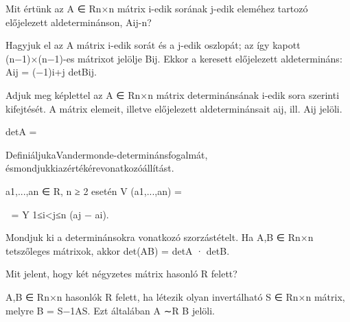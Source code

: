 \begin{frame}
  \begin{tcolorbox}[title={25}]
   Mit értünk az A ∈ Rn×n mátrix i-edik sorának j-edik eleméhez tartozó előjelezett aldeterminánson, Aij-n?

  \tcblower
Hagyjuk el az A mátrix i-edik sorát és a j-edik oszlopát; az így kapott (n−1)×(n−1)-es mátrixot jelölje Bij. Ekkor a keresett előjelezett aldetermináns: Aij = (−1)i+j detBij.

  \end{tcolorbox}
\end{frame}

\begin{frame}
  \begin{tcolorbox}[title={26}]
   Adjuk meg képlettel az A ∈ Rn×n mátrix determinánsának i-edik sora szerinti kifejtését. A mátrix elemeit, illetve előjelezett aldeterminánsait aij, ill. Aij jelöli.

  \tcblower
detA =
  \end{tcolorbox}
\end{frame}


\begin{frame}
  \begin{tcolorbox}[title={28}]
    DeﬁniáljukaVandermonde-determinánsfogalmát, ésmondjukkiazértékérevonatkozóállítást.

  \tcblower
a1,...,an ∈ R, n ≥ 2 esetén V (a1,...,an) =


= Y 1≤i<j≤n
(aj − ai).

  \end{tcolorbox}
\end{frame}


\begin{frame}
  \begin{tcolorbox}[title={30}]
    Mondjuk ki a determinánsokra vonatkozó szorzástételt.
  \tcblower
    Ha A,B ∈ Rn×n tetszőleges mátrixok, akkor det(AB) = detA · detB.
  \end{tcolorbox}
\end{frame}


\begin{frame}
  \begin{tcolorbox}[title={31}]
   Mit jelent, hogy két négyzetes mátrix hasonló R felett?

  \tcblower
    A,B ∈ Rn×n hasonlók R felett, ha létezik olyan invertálható S ∈ Rn×n mátrix, melyre B = S−1AS. Ezt általában A ∼R B jelöli.

  \end{tcolorbox}
\end{frame}


